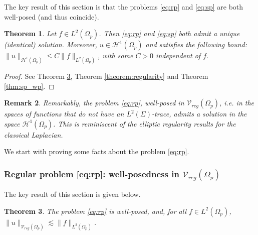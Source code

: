 \documentclass[report]{elsarticle}
\newtheorem{theorem}{Theorem}[section]
\newtheorem{remark}[theorem]{Remark}
\numberwithin{theorem}{section}
\begin{document}
The key result of this section is that the problems \eqref{eq:rp} and \eqref{eq:sp} are both well-posed  (and thus coincide). 
\begin{theorem}
	\label{theorem:fl2}
	Let $f\in L^2(\Omega_p)$. Then \eqref{eq:rp} and \eqref{eq:sp} both admit a unique (identical) solution. Moreover, $u\in \mathcal{H}^1(\Omega_p)$ and satisfies the following bound: 
	$\|u\|_{\mathcal{H}^1(\Omega_p)}\leq C \|f\|_{L^2(\Omega_p)}$, with some $C>0$ independent of $f$.
\end{theorem}
\begin{proof}
	See Theorem \ref{theorem:well_posedness_regular}, Theorem \ref{theorem:regularity} and Theorem \ref{thm:sp_wp}. 
\end{proof}	
\begin{remark}
	Remarkably, the problem \eqref{eq:rp}, well-posed in $\mathcal{V}_{reg}(\Omega_p)$, i.e. in the spaces of functions that do not have an $L^2(\Sigma)$-trace, admits a solution in the space $\mathcal{H}^1(\Omega_p)$. This is reminiscent of the elliptic regularity results for the classical Laplacian.
\end{remark}
We start with proving some facts about the problem \eqref{eq:rp}. 
\subsubsection{Regular problem \eqref{eq:rp}: well-posedness in $\mathcal{V}_{reg}(\Omega_p)$}
The key result of this section is given below. 
\begin{theorem}
	\label{theorem:well_posedness_regular}
	The problem \eqref{eq:rp} is well-posed, and, for all $f\in L^2(\Omega_p)$, $\|u\|_{\mathcal{V}_{reg}(\Omega_p)}\lesssim \|f\|_{L^2(\Omega_p)}$.
\end{theorem}
\end{document}
